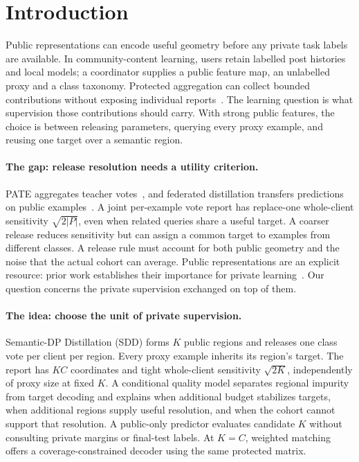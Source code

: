 \section{Introduction}
\label{sec:intro}

Public representations can encode useful geometry before any private task
labels are available. In community-content learning, users retain labelled
post histories and local models; a coordinator supplies a public feature map,
an unlabelled proxy and a class taxonomy. Protected aggregation can collect
bounded contributions without exposing individual reports~\cite{corriganGibbs2017prio,bittau2017prochlo,bonawitz2017practical}.
The learning question is what supervision those contributions should carry.
With strong public features, the choice is between releasing parameters,
querying every proxy example, and reusing one target over a semantic region.

\paragraph{The gap: release resolution needs a utility criterion.}
PATE aggregates teacher votes~\cite{papernot2017semi,papernot2018scalable},
and federated distillation transfers predictions on public
examples~\cite{li2019fedmd,lin2020feddf,itahara2021dsfl,abourayya2025little}.
A joint per-example vote report has replace-one whole-client sensitivity
$\sqrt{2|P|}$, even when related queries share a useful target.
A coarser release reduces sensitivity but can assign a common target to
examples from different classes. A release rule must account for both public
geometry and the noise that the actual cohort can average.
Public representations are an explicit resource: prior work establishes their
importance for private learning~\cite{tramer2021features,li2022large}.
Our question concerns the private supervision exchanged on top of them.

\paragraph{The idea: choose the unit of private supervision.}
Semantic-DP Distillation (SDD) forms $K$ public regions and releases one class
vote per client per region. Every proxy example inherits its region's target.
The report has $KC$ coordinates and tight whole-client sensitivity
$\sqrt{2K}$, independently of proxy size at fixed $K$.
A conditional quality model separates regional impurity from target decoding
and explains when additional budget stabilizes targets, when additional
regions supply useful resolution, and when the cohort cannot support that
resolution. A public-only predictor evaluates candidate $K$ without consulting
private margins or final-test labels. At $K=C$, weighted matching offers a
coverage-constrained decoder using the same protected matrix.

